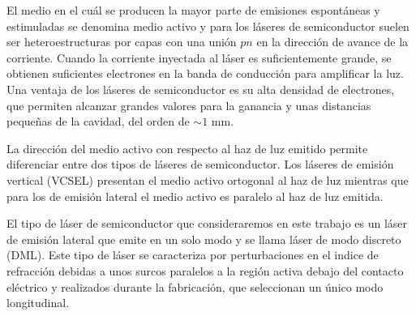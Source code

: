 El medio en el cu\'al se producen la mayor parte de emisiones espont\'aneas y estimuladas se denomina medio activo y para los l\'aseres de semiconductor suelen ser heteroestructuras por capas con una uni\'on $pn$ en la direcci\'on de avance de la corriente. Cuando la corriente inyectada al l\'aser es suficientemente grande, se obtienen suficientes electrones en la banda de conducci\'on para amplificar la luz. Una ventaja de los l\'aseres de semiconductor es su alta densidad de electrones, que permiten alcanzar grandes valores para la ganancia y unas distancias pequeñas de la cavidad, del orden de $\sim 1$ mm.

La direcci\'on del medio activo con respecto al haz de luz emitido permite diferenciar entre dos tipos de l\'aseres de semiconductor. Los l\'aseres de emisi\'on vertical (VCSEL) presentan el medio activo ortogonal al haz de luz mientras que para los de emisión lateral el medio activo es paralelo al haz de luz emitida. 

El tipo de l\'aser de semiconductor que consideraremos en este trabajo es un l\'aser de emisi\'on lateral que emite en un solo modo y se llama l\'aser de modo discreto (DML). Este tipo de l\'aser se caracteriza por perturbaciones en el indice de refracci\'on debidas a unos surcos paralelos a la regi\'on activa debajo del contacto el\'ectrico y realizados durante la fabricaci\'on, que seleccionan un \'unico modo longitudinal.

